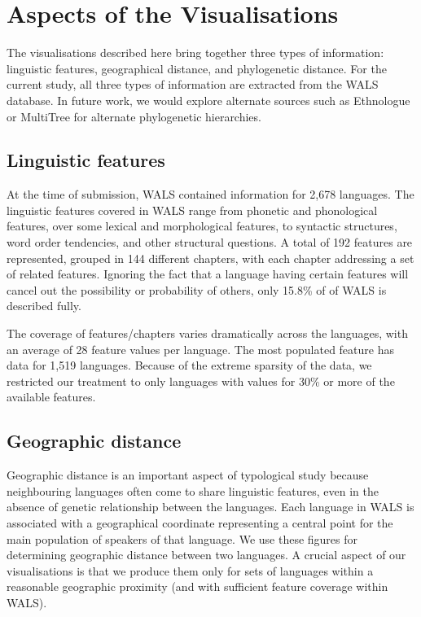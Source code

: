 \documentclass[11pt]{article}
\begin{document}
\section{Aspects of the Visualisations}

The visualisations described here bring together three types of information: linguistic features, geographical distance, and phylogenetic distance. For the current study, all three types of information are extracted from the WALS database. In future work, we would explore alternate sources such as Ethnologue \cite{ethnologue} or MultiTree  for alternate phylogenetic hierarchies. 

\subsection{Linguistic features}
At the time of submission, WALS contained information for 2,678 languages. The linguistic features covered in WALS range from phonetic and phonological features, over some lexical and morphological features, to syntactic structures, word order tendencies, and other structural questions. A total of 192 features are represented, grouped in 144 different chapters, with each chapter addressing a set of related features.  Ignoring the fact that a language having certain features will cancel out the possibility or probability of others, only 15.8\% of of WALS is described fully.

The coverage of features/chapters varies dramatically across the languages, with an average of 28 feature values per language. The most populated feature has data for 1,519 languages. Because of the extreme sparsity of the data, we restricted our treatment to only languages with values for 30\% or more of the available features. 


\subsection{Geographic distance}
Geographic distance is an important aspect of typological study because neighbouring  languages often come to share linguistic features, even in the absence of genetic relationship between the languages. Each language in WALS is associated with a geographical coordinate representing a central point for the main population of speakers of that language. We use these figures for determining geographic distance between two languages. A crucial aspect of our visualisations is that we produce them only for sets of languages within a reasonable geographic proximity (and with sufficient feature coverage within WALS).
\end{document}

